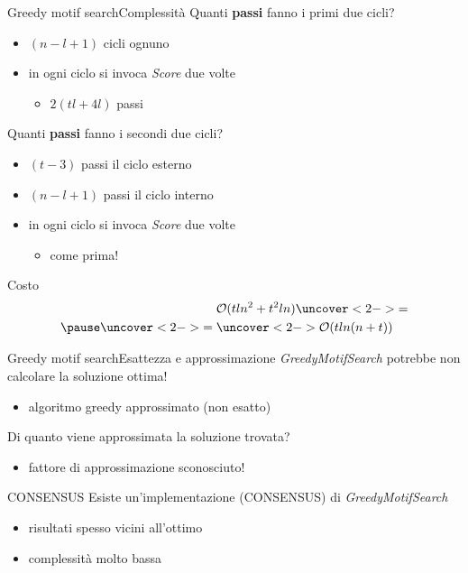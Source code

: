 	\begin{frame}{Greedy motif search}{Complessità}
		Quanti \alert{\textbf{passi}} fanno i primi due cicli?
		\pause
		\begin{itemize}
			\item $(n-l+1)$ cicli ognuno
			\pause
			\item in ogni ciclo si invoca \textit{Score} due volte
			\begin{itemize}
				\item $2(tl+4l)$ passi
			\end{itemize}
			\pause
		\end{itemize}
		Quanti \alert{\textbf{passi}} fanno i secondi due cicli?
		\pause
		\begin{itemize}
			\item $(t-3)$ passi il ciclo esterno
			\pause
			\item $(n-l+1)$ passi il ciclo interno
			\pause
			\item in ogni ciclo si invoca \textit{Score} due volte
			\begin{itemize}
				\item come prima!
			\end{itemize}
			\pause
		\end{itemize}
		\begin{center}
			\begin{minipage}{4cm}		
				\begin{varblock}{Costo}
					\begin{align*}
						&\mathcal{O}(tln^2 + t^2ln) \uncover<2->{=}\\
						\pause
						\uncover<2->{=\;} & \uncover<2->{\mathcal{O}(tln(n+t))}\\
					\end{align*}
				\end{varblock}
			\end{minipage}
		\end{center}
	\end{frame}
	
	\begin{frame}{Greedy motif search}{Esattezza e approssimazione}
		\textit{GreedyMotifSearch} potrebbe non calcolare la soluzione ottima!
		\begin{itemize}
			\item algoritmo greedy approssimato (non esatto)
		\end{itemize}
		\pause
		Di quanto viene approssimata la soluzione trovata?
		\begin{itemize}
			\item fattore di approssimazione sconosciuto!
		\end{itemize}
		\pause
		\begin{block}{CONSENSUS}
			Esiste un'implementazione (CONSENSUS) di \textit{GreedyMotifSearch}
			\begin{itemize}
				\item risultati spesso vicini all'ottimo
				\item complessità molto bassa
			\end{itemize}
		\end{block}
	\end{frame}
	
